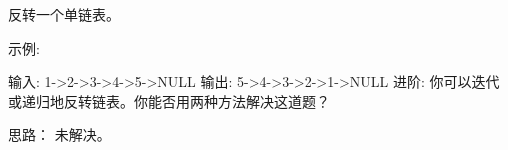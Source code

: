 反转一个单链表。

示例:

输入: 1->2->3->4->5->NULL
输出: 5->4->3->2->1->NULL
进阶:
你可以迭代或递归地反转链表。你能否用两种方法解决这道题？




























思路：
未解决。
